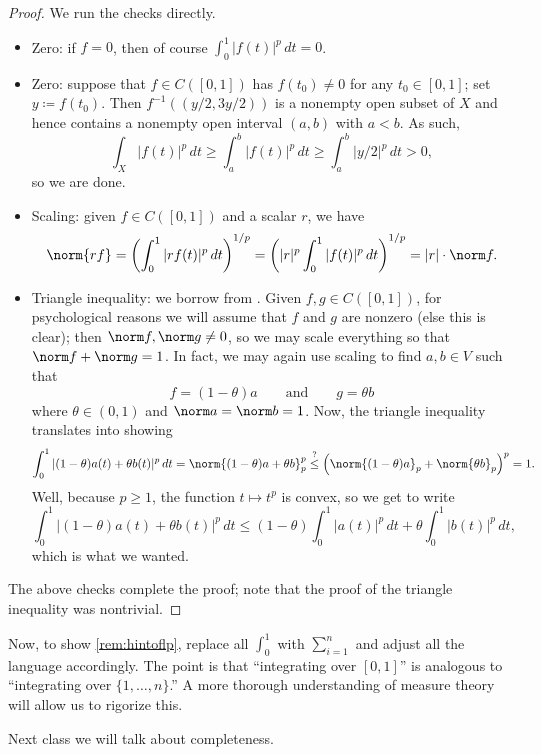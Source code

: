 \documentclass[../notes.tex]{subfiles}
\begin{document}
\begin{proof}
	We run the checks directly.
	\begin{itemize}
		\item Zero: if $f=0$, then of course $\int_0^1|f(t)|^p\,dt=0$.
		\item Zero: suppose that $f\in C([0,1])$ has $f(t_0)\ne0$ for any $t_0\in[0,1]$; set $y\coloneqq f(t_0)$. Then $f^{-1}((y/2,3y/2))$ is a nonempty open subset of $X$ and hence contains a nonempty open interval $(a,b)$ with $a<b$. As such,
		\[\int_X|f(t)|^p\,dt\ge\int_{a}^b|f(t)|^p\,dt\ge\int_{a}^b|y/2|^p\,dt>0,\]
		so we are done.
		\item Scaling: given $f\in C([0,1])$ and a scalar $r$, we have
		\[\norm{rf}=\left(\int_0^1|rf(t)|^p\,dt\right)^{1/p}=\left(|r|^p\int_0^1|f(t)|^p\,dt\right)^{1/p}=|r|\cdot\norm f.\]
		\item Triangle inequality: we borrow from \cite{lpspacestao}. Given $f,g\in C([0,1])$, for psychological reasons we will assume that $f$ and $g$ are nonzero (else this is clear); then $\norm f,\norm g\ne0$, so we may scale everything so that $\norm f+\norm g=1$. In fact, we may again use scaling to find $a,b\in V$ such that
		\[f=(1-\theta)a\qquad\text{and}\qquad g=\theta b\]
		where $\theta\in(0,1)$ and $\norm a=\norm b=1$. Now, the triangle inequality translates into showing
		\[\int_0^1|(1-\theta)a(t)+\theta b(t)|^p\,dt=\norm{(1-\theta)a+\theta b}^p_p\stackrel?\le\left(\norm{(1-\theta)a}_p+\norm{\theta b}_p\right)^p=1.\]
		Well, because $p\ge1$, the function $t\mapsto t^p$ is convex, so we get to write
		\[\int_0^1|(1-\theta)a(t)+\theta b(t)|^p\,dt\le(1-\theta)\int_0^1|a(t)|^p\,dt+\theta\int_0^1|b(t)|^p\,dt,\]
		which is what we wanted.
	\end{itemize}
	The above checks complete the proof; note that the proof of the triangle inequality was nontrivial.
\end{proof}
\begin{remark}
	Now, to show \autoref{rem:hintoflp}, replace all $\int_0^1$ with $\sum_{i=1}^n$ and adjust all the language accordingly. The point is that ``integrating over $[0,1]$'' is analogous to ``integrating over $\{1,\ldots,n\}$.'' A more thorough understanding of measure theory will allow us to rigorize this.
\end{remark}
Next class we will talk about completeness.
\end{document}
